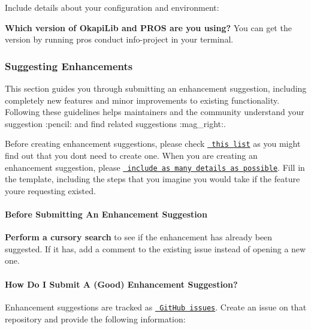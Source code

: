 Include details about your configuration and environment\+:


\begin{DoxyItemize}
\item {\bfseries{Which version of Okapi\+Lib and P\+R\+OS are you using?}} You can get the version by running {\ttfamily pros conduct info-\/project} in your terminal.
\end{DoxyItemize}

\subsubsection*{Suggesting Enhancements}

This section guides you through submitting an enhancement suggestion, including completely new features and minor improvements to existing functionality. Following these guidelines helps maintainers and the community understand your suggestion \+:pencil\+: and find related suggestions \+:mag\+\_\+right\+:.

Before creating enhancement suggestions, please check \href{\#before-submitting-an-enhancement-suggestion}{\texttt{ this list}} as you might find out that you don\textquotesingle{}t need to create one. When you are creating an enhancement suggestion, please \href{\#how-do-i-submit-a-good-enhancement-suggestion}{\texttt{ include as many details as possible}}. Fill in the template, including the steps that you imagine you would take if the feature you\textquotesingle{}re requesting existed.

\paragraph*{Before Submitting An Enhancement Suggestion}


\begin{DoxyItemize}
\item {\bfseries{Perform a cursory search}} to see if the enhancement has already been suggested. If it has, add a comment to the existing issue instead of opening a new one.
\end{DoxyItemize}

\paragraph*{How Do I Submit A (Good) Enhancement Suggestion?}

Enhancement suggestions are tracked as \href{https://guides.github.com/features/issues/}{\texttt{ Git\+Hub issues}}. Create an issue on that repository and provide the following information\+:


